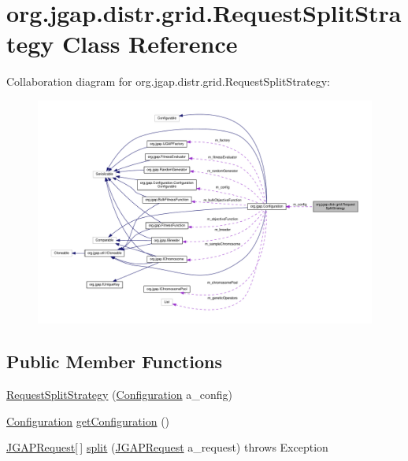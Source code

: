 \hypertarget{classorg_1_1jgap_1_1distr_1_1grid_1_1_request_split_strategy}{\section{org.\-jgap.\-distr.\-grid.\-Request\-Split\-Strategy Class Reference}
\label{classorg_1_1jgap_1_1distr_1_1grid_1_1_request_split_strategy}
}


Collaboration diagram for org.\-jgap.\-distr.\-grid.\-Request\-Split\-Strategy\-:
\nopagebreak
\begin{figure}[H]
\begin{center}
\leavevmode
\includegraphics[width=350pt]{classorg_1_1jgap_1_1distr_1_1grid_1_1_request_split_strategy__coll__graph}
\end{center}
\end{figure}
\subsection*{Public Member Functions}
\begin{DoxyCompactItemize}
\item 
\hyperlink{classorg_1_1jgap_1_1distr_1_1grid_1_1_request_split_strategy_ae7a5a7fdfb216eaa71bda637cdcb2864}{Request\-Split\-Strategy} (\hyperlink{classorg_1_1jgap_1_1_configuration}{Configuration} a\-\_\-config)
\item 
\hyperlink{classorg_1_1jgap_1_1_configuration}{Configuration} \hyperlink{classorg_1_1jgap_1_1distr_1_1grid_1_1_request_split_strategy_aa2d0c4382cecdeb76f31cf437effbc37}{get\-Configuration} ()
\item 
\hyperlink{classorg_1_1jgap_1_1distr_1_1grid_1_1_j_g_a_p_request}{J\-G\-A\-P\-Request}\mbox{[}$\,$\mbox{]} \hyperlink{classorg_1_1jgap_1_1distr_1_1grid_1_1_request_split_strategy_afa4582eef1f6ae141ff15d706cf7ec68}{split} (\hyperlink{classorg_1_1jgap_1_1distr_1_1grid_1_1_j_g_a_p_request}{J\-G\-A\-P\-Request} a\-\_\-request)  throws Exception 
\end{DoxyCompactItemize}
